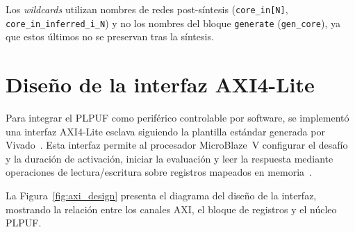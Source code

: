 Los \textit{wildcards} utilizan nombres de redes post-síntesis
(\texttt{core\_in[N]}, \texttt{core\_in\_inferred\_i\_N}) y no los nombres
del bloque \texttt{generate} (\texttt{gen\_core}), ya que estos últimos no
se preservan tras la síntesis.

\section{Diseño de la interfaz AXI4-Lite}
\label{sec:diseno_axi}

Para integrar el PLPUF como periférico controlable por software, se
implementó una interfaz AXI4-Lite esclava siguiendo la plantilla estándar
generada por Vivado~\cite{ug1037}. Esta interfaz permite al procesador
MicroBlaze~V configurar el desafío y la duración de activación, iniciar la
evaluación y leer la respuesta mediante operaciones de lectura/escritura
sobre registros mapeados en memoria~\cite{ihi0022h}.

La Figura~\ref{fig:axi_design} presenta el diagrama del diseño de la
interfaz, mostrando la relación entre los canales AXI, el bloque de
registros y el núcleo PLPUF.

